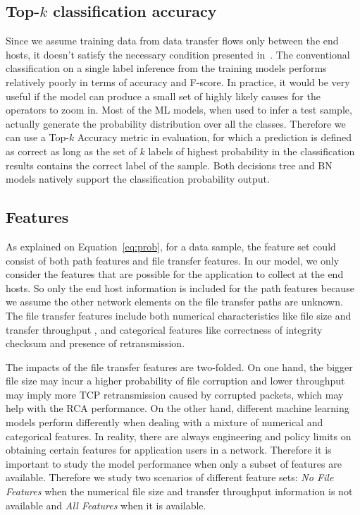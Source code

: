 \subsection{Top-$k$ classification accuracy} 
Since we assume training data from data transfer flows only between the end hosts, it doesn't satisfy the necessary condition presented in~\cite{netbouncer:nsdi18}. The conventional classification on a single label inference from the training models performs relatively poorly in terms of accuracy and F-score. In practice, it would be very useful if the model can produce a small set of highly likely causes for the operators to zoom in. Most of the ML models, when used to infer a test sample, actually generate the probability distribution over all the classes. Therefore we can use a Top-$k$ Accuracy metric in evaluation, for which a prediction is defined as correct as long as the set of $k$ labels of highest probability in the classification results contains the correct label of the sample. Both decisions tree and BN models natively support the classification probability output. 

\subsection{Features}
As explained on Equation~\ref{eq:prob}, for a data sample, the feature set could consist of both path features and file transfer features. In our model, we only consider the features that are possible for the application to collect at the end hosts.
So only the end host information is included for the path features because we assume the other network elements on the file transfer paths are unknown. 
The file transfer features include both numerical characteristics like file size and transfer throughput , and categorical features like correctness of integrity checksum and presence of retransmission. 

The impacts of the file transfer features are two-folded. On one hand, the bigger file size may incur a higher probability of file corruption and lower throughput may imply more TCP retransmission caused by corrupted packets, which may help with the RCA performance. On the other hand, different machine learning models perform differently when dealing with a mixture of numerical and categorical features. In reality, there are always engineering and policy limits on obtaining certain 
features for application users in a network. Therefore it is important to study the model performance when only a subset of features are available. Therefore we study two scenarios of different feature sets: {\it No File Features} when the numerical file size and transfer throughput information is not available and {\it All Features} when it is available.

